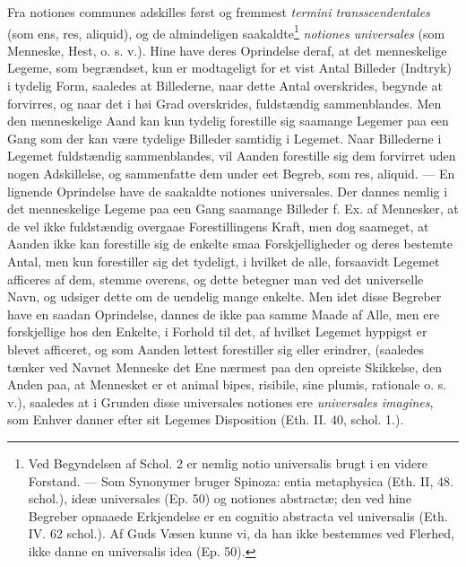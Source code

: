 \documentclass[12pt,a4paper]{book}
\newcommand{\opage}[1]{\marginnote{\footnotesize\textit{[#1]}}}
\begin{document}
Fra notiones communes adskilles først og fremmest \emph{termini
transscendentales} (som ens, res, aliquid), og
\opage{98} \setcounter{footnote}{0}%
de almindeligen saakaldte\footnote{Ved Begyndelsen af Schol. 2 er
nemlig notio universalis brugt i en videre Forstand. --- Som
Synonymer bruger Spinoza: entia metaphysica (Eth. II, 48. schol.),
ideæ universales (Ep. 50) og notiones abstractæ; den ved hine
Begreber opnaaede Erkjendelse er en cognitio abstracta vel
universalis (Eth. IV. 62 schol.). Af Guds Væsen kunne vi, da han
ikke bestemmes ved Flerhed, ikke danne en universalis idea (Ep.
50).} \emph{notiones universales} (som Menneske, Hest, o. s. v.). Hine have
deres Oprindelse deraf, at det menneskelige Legeme, som begrændset,
kun er modtageligt for et vist Antal Billeder (Indtryk) i tydelig
Form, saaledes at Billederne, naar dette Antal overskrides, begynde
at forvirres, og naar det i høi Grad overskrides, fuldstændig
sammenblandes. Men den menneskelige Aand kan kun tydelig forestille
sig saamange Legemer paa een Gang som der kan være tydelige Billeder
samtidig i Legemet. Naar Billederne i Legemet fuldstændig
sammenblandes, vil Aanden forestille sig dem forvirret uden nogen
Adskillelse, og sammenfatte dem under eet Begreb, som res, aliquid.
--- En lignende Oprindelse have de saakaldte notiones universales.
Der dannes nemlig i det menneskelige Legeme paa een Gang saamange
Billeder f. Ex. af Mennesker, at de vel ikke fuldstændig overgaae
Forestillingens Kraft, men dog saameget, at Aanden ikke kan
forestille sig de enkelte smaa Forskjelligheder og deres bestemte
Antal, men kun forestiller sig det tydeligt, i hvilket de alle,
forsaavidt Legemet afficeres af dem, stemme overens, og dette
betegner man ved det universelle Navn, og udsiger dette om de
uendelig mange enkelte. Men idet disse Begreber have en saadan
Oprindelse, dannes de ikke paa samme Maade af Alle, men ere
forskjellige hos den Enkelte, i Forhold til det, af hvilket Legemet
hyppigst er blevet afficeret, og som Aanden lettest forestiller sig
eller erindrer, (saaledes tænker ved Navnet Menneske det Ene nærmest
paa den opreiste Skikkelse, den Anden paa, at Mennesket er et animal
bipes, risibile, sine plumis, rationale o. s. v.),
\opage{99} \setcounter{footnote}{0}%
saaledes at i Grunden disse universales notiones ere \emph{universales
imagines}, som Enhver danner efter sit Legemes Disposition (Eth. II.
40, schol. 1.).
\end{document}
